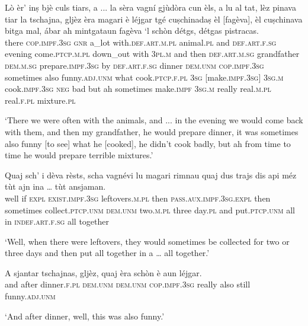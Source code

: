 \begin{linenumbers}
\gll  Lò èr’ inṣ bjè culs tiars, a ... la sèra vagní gjùdòra cun èls, a lu al tat, lèz pinava tiar la tschajna, gljèz èra magari è léjgar tgé cuṣchinadaṣ èl [fagèva], èl cuṣchinava bitga mal, ábar ah mintgataun fagèva `l schòn détgs, détgas pistracas.\\
there \textsc{cop.impf.3sg} \textsc{gnr} a\_lot  with.\textsc{def.art.m.pl} animal.\textsc{pl} and {} \textsc{def.art.f.sg} evening  come.\textsc{ptcp.m.pl} down\_out with \textsc{3pl.m} and then \textsc{def.art.m.sg} grandfather \textsc{dem.m.sg} prepare.\textsc{impf.3sg} by \textsc{def.art.f.sg} dinner \textsc{dem.unm} \textsc{cop.impf.3sg} sometimes also funny.\textsc{adj.unm} what cook.\textsc{ptcp.f.pl} \textsc{3sg} [make.\textsc{impf.3sg}] \textsc{3sg.m} cook.\textsc{impf.3sg} \textsc{neg} bad but ah sometimes make.\textsc{impf} \textsc{3sg.m} really real.\textsc{m.pl} real.\textsc{f.pl} mixture.\textsc{pl}\\
\end{linenumbers}
\medskip
\glt `There we were often with the animals, and ... in the evening we would come back with them, and then my grandfather, he would prepare dinner, it was sometimes also funny [to see] what he [cooked], he didn’t cook badly, but ah from time to time he would prepare terrible mixtures.'
\medskip

\begin{linenumbers}
\gll  Quaj sch’ i dèva rèsts, scha vagnévi lu magari rimnau quaj dus trajs dis api méz tùt ajn ina … tùt ansjaman.  \\
well if \textsc{expl} \textsc{exist.impf.3sg} leftovers.\textsc{m.pl} then \textsc{pass.aux.impf.3sg.expl} then sometimes collect.\textsc{ptcp.unm} \textsc{dem.unm} two.\textsc{m.pl} three day.\textsc{pl} and put.\textsc{ptcp.unm} all in  \textsc{indef.art.f.sg} {} all together\\
\end{linenumbers} 
\medskip
\glt `Well, when there were leftovers, they would sometimes be collected for two or three days and then put all together in a … all together.'
\medskip

\begin{linenumbers}
\gll A sjantar tschajnas, gljèz, quaj èra schòn è aun léjgar.   \\
and after dinner.\textsc{f.pl} \textsc{dem.unm} \textsc{dem.unm} \textsc{cop.impf.3sg} really also still funny.\textsc{adj.unm}  \\
\end{linenumbers}
\medskip
\glt `And after dinner, well, this was also funny.'
\medskip

